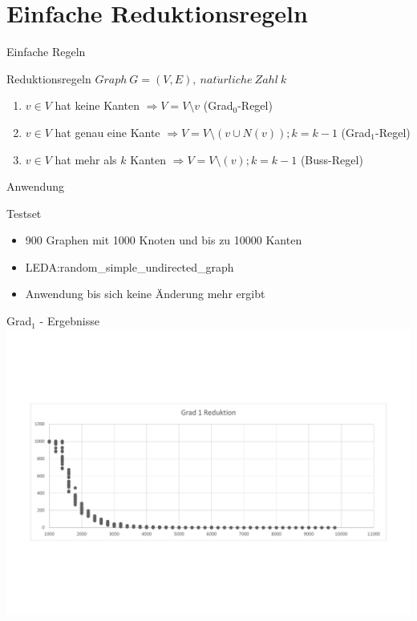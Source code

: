 \documentclass{beamer}
\begin{document}
\section{Einfache Reduktionsregeln}
\begin{frame}{Einfache Regeln}
\begin{block}{Reduktionsregeln} 
$Graph\ G=(V,E),\ nat\ddot{u}rliche\ Zahl\ k$ 
\begin{enumerate}
\item $v \in V$ hat keine Kanten $\Rightarrow V = V \setminus v$ (Grad$_{0}$-Regel)  
\item $v \in V$ hat genau eine Kante $\Rightarrow V = V \setminus (v \cup N(v)); k = k-1 $ (Grad$_{1}$-Regel)  
\item $v \in V$ hat mehr als $k$ Kanten $\Rightarrow V = V \setminus (v); k = k-1 $ (Buss-Regel)

\end{enumerate}
\end{block}
\end{frame}

\begin{frame}{Anwendung}
\begin{block}{Testset} 
\begin{itemize}
\item 900 Graphen mit 1000 Knoten und bis zu 10000 Kanten 
\item LEDA:random\_simple\_undirected\_graph 
\item Anwendung bis sich keine Änderung mehr ergibt
\end{itemize}
\end{block}
\end{frame}


\begin{frame}{Grad$_{1}$ - Ergebnisse}
\includegraphics[scale= .4]{analysisOne.pdf} 
\end{frame}
\end{document}
